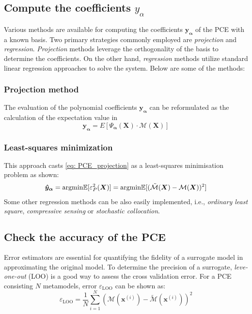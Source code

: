 \subsection{Compute the coefficients $y_{\alpha}$}
Various methods are available for computing the coefficients $\boldsymbol{y_{\alpha}}$ of the \acrshort{PCE} with a known basis. Two primary strategies commonly employed are \textit{projection} and \textit{regression}. \textit{Projection} methods leverage the orthogonality of the basis to determine the coefficients. On the other hand, \textit{regression} methods utilize standard linear regression approaches to solve the system. Below are some of the methods:

\subsubsection{Projection method}
The evaluation of the polynomial coefficients $\boldsymbol{y_{\alpha}}$ can be reformulated as the calculation of the expectation value in 
\begin{equation}
\label{eq: PCE_projection}
\boldsymbol{y_{\alpha}} = E [\Psi_{\boldsymbol{\alpha}}(\boldsymbol{X}) \cdot \mathcal{M}(\boldsymbol{X})]
\end{equation}

\subsubsection{Least-squares minimization}
This approach casts \cref{eq: PCE_projection} as a least-squares minimisation problem as shown:
\begin{equation}
\boldsymbol{\hat{y}_{\alpha}} = {\rm{argmin}} \mathbb{E} [\varepsilon_{P}^2(\boldsymbol{X})] = {\rm{argmin}} \mathbb{E} [(\tilde{\mathcal{M}}(\boldsymbol{X}) - \mathcal{M}(\boldsymbol{X}))^2]
\end{equation}
Some other regression methods can be also easily implemented, i.e., \textit{ordinary least square}, \textit{compressive sensing} or \textit{stochastic collocation}.


\subsection{Check the accuracy of the \acrshort{PCE}}
Error estimators are essential for quantifying the fidelity of a surrogate model in approximating the original model. To determine the precision of a surrogate, \textit{leve-one-out} (LOO) is a good way to assess the cross validation error. For a \acrshort{PCE} consisting $N$ metamodels, error $\varepsilon_{\text{LOO}}$ can be shown as:
\begin{equation}
\varepsilon_{\text{LOO}} = \frac{1}{N} \sum_{i=1}^{N} \left( \mathcal{M}(\boldsymbol{x}^{(i)}) - \tilde{\mathcal{M}}(\boldsymbol{x}^{(i)}) \right)^2
\end{equation}




